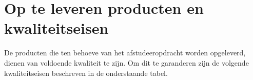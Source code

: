 \chapter{Op te leveren producten en kwaliteitseisen}
De producten die ten behoeve van het afstudeeropdracht worden opgeleverd, dienen van voldoende kwaliteit te zijn. Om dit te garanderen zijn de volgende kwaliteitseisen beschreven in de onderstaande tabel.

